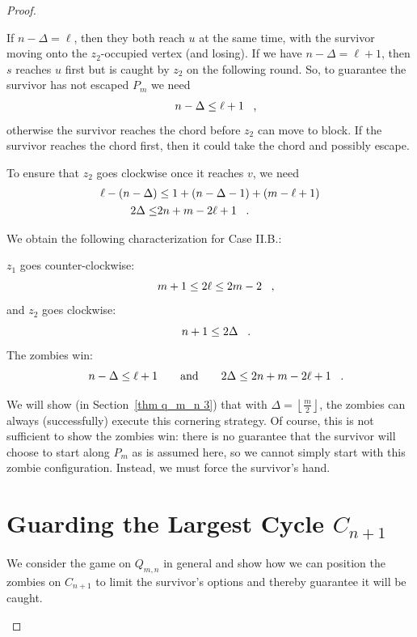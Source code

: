 \begin{proof}
\begin{proofpart}
\begin{itemize}
  If $n - \Delta = \ell$, then they both reach $u$ at the same time,
  with the survivor moving onto the $z_2$-occupied vertex (and losing).
  If we have $n - \Delta = \ell + 1$, then $s$ reaches $u$ first
  but is caught by $z_2$ on the following round.
  So, to guarantee the survivor has not escaped $P_m$ we need
  \begin{align*}
   n - \Delta &\leq \ell + 1 \mcomma \\
  \end{align*}
  otherwise the survivor reaches the chord before $z_2$ can move
  to block. If the survivor reaches the chord first, then it could
  take the chord and possibly escape.

  To ensure that $z_2$ goes clockwise once it reaches $v$, we need
  \begin{align*}
   \ell - (n - \Delta) &\leq 1 + (n - \Delta - 1) + (m - \ell + 1) \\
   2 \Delta \leq            & 2n + m - 2\ell + 1 \mperiod
  \end{align*}

  We obtain the following characterization for Case II.B.:

  $z_1$ goes counter-clockwise:
  \[ m + 1 \leq 2 \ell \leq 2m - 2 \mcomma \]
  and $z_2$ goes clockwise:
  \[ n+1 \leq 2 \Delta \mperiod\]
  The zombies win:
  \[ n - \Delta \leq \ell + 1 \qquad \text{and} \qquad 2 \Delta \leq 2n + m - 2\ell + 1 \mperiod \]

\end{itemize}

We will show (in Section~\ref{thm q_m_n 3}) that with $\Delta = \left\lfloor \frac{m}{2} \right\rfloor$, the zombies can always (successfully) execute this cornering strategy. Of course, this is not sufficient to show the zombies win: there is no guarantee that the survivor will choose to start along $P_m$ as is assumed here, so we cannot simply start with this zombie configuration. Instead, we must force the survivor's hand.
\end{proofpart}

  \section{Guarding the Largest Cycle $C_{n+1}$\label{thm q_m_n 2}}
\begin{proofpart}
  We consider the game on $Q_{m,n}$ in general and show
  how we can position the zombies on $C_{n+1}$ to limit the survivor's options and thereby guarantee it will be caught.


\end{proofpart}
\end{proof}
